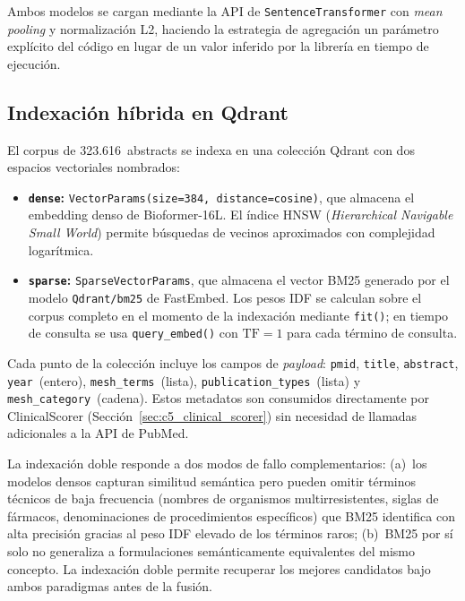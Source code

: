 \documentclass[11pt,a4paper,spanish]{book}
\numberwithin{equation}{chapter}
\numberwithin{figure}{chapter}
\begin{document}
Ambos modelos se cargan mediante la API de \texttt{SentenceTransformer} con \textit{mean pooling} y normalización L2, haciendo la estrategia de agregación un parámetro explícito del código en lugar de un valor inferido por la librería en tiempo de ejecución.

\subsection{Indexación híbrida en Qdrant}
\label{sec:c5_qdrant_index}

El corpus de 323.616~abstracts se indexa en una colección Qdrant con dos espacios vectoriales nombrados:

\begin{itemize}
  \item \textbf{\texttt{dense}:} \texttt{VectorParams(size=384, distance=cosine)}, que almacena el embedding denso de Bioformer-16L. El índice HNSW (\textit{Hierarchical Navigable Small World}) \cite{malkov_efficient_2020} permite búsquedas de vecinos aproximados con complejidad logarítmica.
  \item \textbf{\texttt{sparse}:} \texttt{SparseVectorParams}, que almacena el vector BM25 \cite{robertson2009bm25} generado por el modelo \texttt{Qdrant/bm25} de FastEmbed. Los pesos IDF se calculan sobre el corpus completo en el momento de la indexación mediante \texttt{fit()}; en tiempo de consulta se usa \texttt{query\_embed()} con $\mathrm{TF}=1$ para cada término de consulta.
\end{itemize}

Cada punto de la colección incluye los campos de \textit{payload}: \texttt{pmid}, \texttt{title}, \texttt{abstract}, \texttt{year}~(entero), \texttt{mesh\_terms}~(lista), \texttt{publication\_types}~(lista) y \texttt{mesh\_category}~(cadena). Estos metadatos son consumidos directamente por ClinicalScorer (Sección~\ref{sec:c5_clinical_scorer}) sin necesidad de llamadas adicionales a la API de PubMed.

La indexación doble responde a dos modos de fallo complementarios: (a)~los modelos densos capturan similitud semántica pero pueden omitir términos técnicos de baja frecuencia (nombres de organismos multirresistentes, siglas de fármacos, denominaciones de procedimientos específicos) que BM25 identifica con alta precisión gracias al peso IDF elevado de los términos raros; (b)~BM25 por sí solo no generaliza a formulaciones semánticamente equivalentes del mismo concepto. La indexación doble permite recuperar los mejores candidatos bajo ambos paradigmas antes de la fusión.
\end{document}
